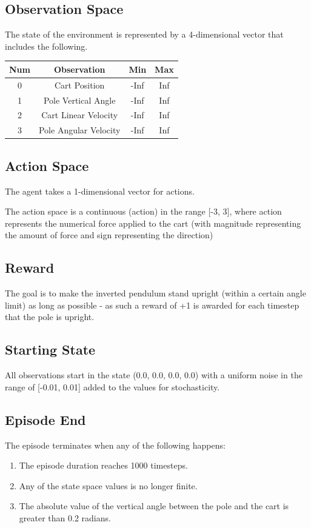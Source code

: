\documentclass{article} %
\begin{document}
\subsection{Observation Space}
The state of the environment is represented by a 4-dimensional vector that includes the following.

\begin{center}
    \begin{tabular}{cccc}
        \toprule
        Num & Observation & Min & Max \\
        \midrule
        0 & Cart Position & -Inf & Inf \\
        1 & Pole Vertical Angle & -Inf & Inf \\
        2 & Cart Linear Velocity & -Inf & Inf \\
        3 & Pole Angular Velocity & -Inf & Inf \\
        \bottomrule
    \end{tabular}
\end{center}

\subsection{Action Space}
The agent takes a 1-dimensional vector for actions.

The action space is a continuous (action) in the range [-3, 3], where action represents the numerical force applied to the cart (with magnitude representing the amount of force and sign representing the direction)

\subsection{Reward}
The goal is to make the inverted pendulum stand upright (within a certain angle limit) as long as possible - as such a reward of +1 is awarded for each timestep that the pole is upright.

\subsection{Starting State}
All observations start in the state (0.0, 0.0, 0.0, 0.0) with a uniform noise in the range of [-0.01, 0.01] added to the values for stochasticity.

\subsection{Episode End}
The episode terminates when any of the following happens: \begin{enumerate}
\item The episode duration reaches 1000 timesteps.
\item Any of the state space values is no longer finite.
\item The absolute value of the vertical angle between the pole and the cart is greater than 0.2 radians.
\end{enumerate}
\end{document}
